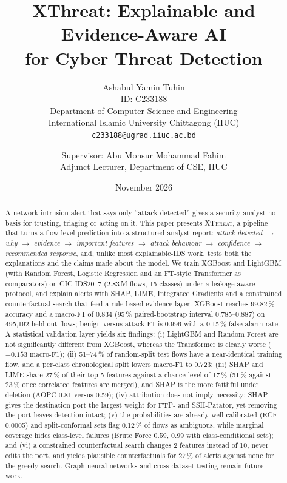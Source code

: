 \documentclass[11pt,a4paper]{article}
\title{\textbf{XThreat: Explainable and Evidence-Aware AI\\for Cyber Threat Detection}}
\author{
Ashabul Yamin Tuhin\\
ID: C233188\\
Department of Computer Science and Engineering\\
International Islamic University Chittagong (IIUC)\\
\texttt{c233188@ugrad.iiuc.ac.bd}
\and
Supervisor: Abu Monsur Mohammad Fahim\\
Adjunct Lecturer, Department of CSE, IIUC
}
\date{November 2026}
\newcommand{\XT}{\textsc{XThreat}}
\begin{document}
\maketitle

\begin{abstract}
A network-intrusion alert that says only ``attack detected'' gives a security analyst no basis for trusting, triaging or acting on it. This paper presents \XT, a pipeline that turns a flow-level prediction into a structured analyst report: \emph{attack detected $\rightarrow$ why $\rightarrow$ evidence $\rightarrow$ important features $\rightarrow$ attack behaviour $\rightarrow$ confidence $\rightarrow$ recommended response}, and, unlike most explainable-IDS work, tests both the explanations and the claims made about the model. We train XGBoost and LightGBM (with Random Forest, Logistic Regression and an FT-style Transformer as comparators) on CIC-IDS2017 (2.83\,M flows, 15 classes) under a leakage-aware protocol, and explain alerts with SHAP, LIME, Integrated Gradients and a constrained counterfactual search that feed a rule-based evidence layer. XGBoost reaches 99.82\,\% accuracy and a macro-F1 of 0.834 (95\,\% paired-bootstrap interval 0.785--0.887) on 495{,}192 held-out flows; benign-versus-attack F1 is 0.996 with a 0.15\,\% false-alarm rate. A statistical validation layer yields six findings: (i) LightGBM and Random Forest are not significantly different from XGBoost, whereas the Transformer is clearly worse ($-0.153$ macro-F1); (ii) 51--74\,\% of random-split test flows have a near-identical training flow, and a per-class chronological split lowers macro-F1 to 0.723; (iii) SHAP and LIME share 27\,\% of their top-5 features against a chance level of 17\,\% (51\,\% against 23\,\% once correlated features are merged), and SHAP is the more faithful under deletion (AOPC 0.81 versus 0.59); (iv) attribution does not imply necessity: SHAP gives the destination port the largest weight for FTP- and SSH-Patator, yet removing the port leaves detection intact; (v) the probabilities are already well calibrated (ECE 0.0005) and split-conformal sets flag 0.12\,\% of flows as ambiguous, while marginal coverage hides class-level failures (Brute Force 0.59, 0.99 with class-conditional sets); and (vi) a constrained counterfactual search changes 2 features instead of 10, never edits the port, and yields plausible counterfactuals for 27\,\% of alerts against none for the greedy search. Graph neural networks and cross-dataset testing remain future work.
\end{abstract}
\end{document}

